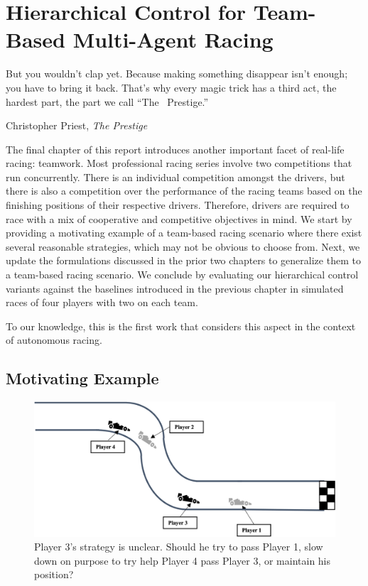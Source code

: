 \chapter{Hierarchical Control for Team-Based Multi-Agent Racing}
\epigraph{\flushright But you wouldn't clap yet. Because making something disappear isn't enough; you have to bring it back. That's why every magic trick has a third act, the hardest part, the part we call ``The~ Prestige.''}{Christopher Priest, \textit{The Prestige}}
\label{chapter:team}
The final chapter of this report introduces another important facet of real-life racing: teamwork. Most professional racing series involve two competitions that run concurrently. There is an individual competition amongst the drivers, but there is also a competition over the performance of the racing teams based on the finishing positions of their respective drivers. Therefore, drivers are required to race with a mix of cooperative and competitive objectives in mind. We start by providing a motivating example of a team-based racing scenario where there exist several reasonable strategies, which may not be obvious to choose from. Next, we update the formulations discussed in the prior two chapters to generalize them to a team-based racing scenario. We conclude by evaluating our hierarchical control variants against the baselines introduced in the previous chapter in simulated races of four players with two on each team.

To our knowledge, this is the first work that considers this aspect in the context of autonomous racing. 

\section{Motivating Example}
\begin{figure}
  \centering
  \includegraphics[width=\textwidth]{Figures/TeamMotiv.png}
  \caption[Motivating example for team-based racing] {Player 3's strategy is unclear. Should he try to pass Player 1, slow down on purpose to try help Player 4 pass Player 3, or maintain his position?}
  \label{fig:team_motivating}
\end{figure}

